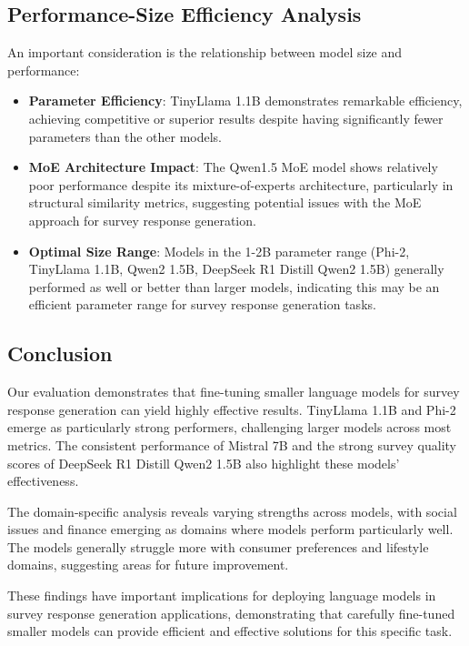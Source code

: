 \documentclass[11pt]{article}
\begin{document}
\subsection{Performance-Size Efficiency Analysis}

An important consideration is the relationship between model size and performance:

\begin{itemize}
\item \textbf{Parameter Efficiency}: TinyLlama 1.1B demonstrates remarkable efficiency, achieving competitive or superior results despite having significantly fewer parameters than the other models.

\item \textbf{MoE Architecture Impact}: The Qwen1.5 MoE model shows relatively poor performance despite its mixture-of-experts architecture, particularly in structural similarity metrics, suggesting potential issues with the MoE approach for survey response generation.

\item \textbf{Optimal Size Range}: Models in the 1-2B parameter range (Phi-2, TinyLlama 1.1B, Qwen2 1.5B, DeepSeek R1 Distill Qwen2 1.5B) generally performed as well or better than larger models, indicating this may be an efficient parameter range for survey response generation tasks.
\end{itemize}

\subsection{Conclusion}

Our evaluation demonstrates that fine-tuning smaller language models for survey response generation can yield highly effective results. TinyLlama 1.1B and Phi-2 emerge as particularly strong performers, challenging larger models across most metrics. The consistent performance of Mistral 7B and the strong survey quality scores of DeepSeek R1 Distill Qwen2 1.5B also highlight these models' effectiveness.

The domain-specific analysis reveals varying strengths across models, with social issues and finance emerging as domains where models perform particularly well. The models generally struggle more with consumer preferences and lifestyle domains, suggesting areas for future improvement.

These findings have important implications for deploying language models in survey response generation applications, demonstrating that carefully fine-tuned smaller models can provide efficient and effective solutions for this specific task.
\end{document}
